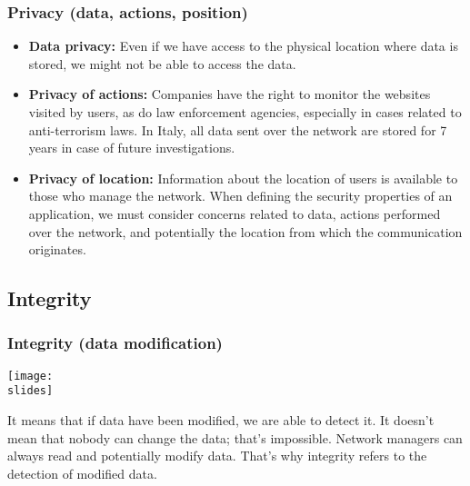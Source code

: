 \subsubsection*{Privacy (data, actions, position)}
\begin{itemize}
  \item \textbf{Data privacy:} Even if we have access to the physical location where data is stored, we might not be able to access the data.
  \item \textbf{Privacy of actions:} Companies have the right to monitor the websites visited by users, as do law enforcement agencies, especially in cases related to anti-terrorism laws. In Italy, all data sent over the network are stored for 7 years in case of future investigations.
  \item \textbf{Privacy of location:} Information about the location of users is available to those who manage the network. When defining the security properties of an application, we must consider concerns related to data, actions performed over the network, and potentially the location from which the communication originates.
\end{itemize}



\subsection{Integrity}

\subsubsection*{Integrity (data modification)}
\noindent
\begin{minipage}{0.5\textwidth}
  \centering
  \texttt{[image: \\slides]}
\end{minipage}
\hspace{0.05\textwidth}
\begin{minipage}{0.4\textwidth}
  It means that if data have been modified, we are able to detect it. It doesn't mean that nobody can change the data; that's impossible. Network managers can always read and potentially modify data. That's why integrity refers to the detection of modified data.
\end{minipage}

